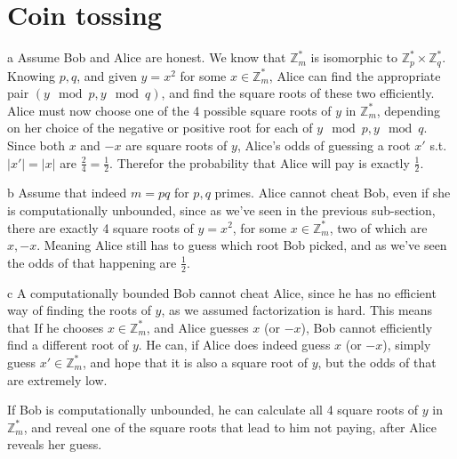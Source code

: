 \documentclass{article}
\begin{document}
\section{Coin tossing}
\begin{paragraph}
    a Assume Bob and Alice are honest. We know that \(\mathbb{Z}^*_m\) is isomorphic to \(\mathbb{Z}^*_p \times \mathbb{Z}^*_q\). Knowing \(p, q\), and given \(y = x^2\) for some \(x \in \mathbb{Z}^*_m\), Alice can find the appropriate pair \((y \mod{p}, y \mod{q})\), and find the square roots of these two efficiently. Alice must now choose one of the 4 possible square roots of \(y\) in \(\mathbb{Z}^*_m\), depending on her choice of the negative or positive root for each of \(y \mod{p}, y \mod{q}\). Since both \(x\) and \(-x\) are square roots of \(y\), Alice's odds of guessing a root \(x'\) s.t. \(|x'| = |x|\) are \(\frac{2}{4} = \frac{1}{2}\). Therefor the probability that Alice will pay is exactly \(\frac{1}{2}\).
\end{paragraph}

\begin{paragraph}
    b Assume that indeed \(m = pq\) for \(p, q\) primes. Alice cannot cheat Bob, even if she is computationally unbounded, since as we've seen in the previous sub-section, there are exactly 4 square roots of \(y = x^2\), for some \(x \in \mathbb{Z}^*_m\), two of which are \(x, -x\). Meaning Alice still has to guess which root Bob picked, and as we've seen the odds of that happening are \(\frac{1}{2}\).
\end{paragraph}

\begin{paragraph}
    c A computationally bounded Bob cannot cheat Alice, since he has no efficient way of finding the roots of \(y\), as we assumed factorization is hard. This means that If he chooses \(x \in \mathbb{Z}^*_m\), and Alice guesses \(x\) (or \(-x\)), Bob cannot efficiently find a different root of \(y\). He can, if Alice does indeed guess \(x\) (or \(-x\)), simply guess \(x' \in \mathbb{Z}^*_m\), and hope that it is also a square root of \(y\), but the odds of that are extremely low.
    
    If Bob is computationally unbounded, he can calculate all 4 square roots of \(y\) in \(\mathbb{Z}^*_m\), and reveal one of the square roots that lead to him not paying, after Alice reveals her guess.
\end{paragraph}
\end{document}
